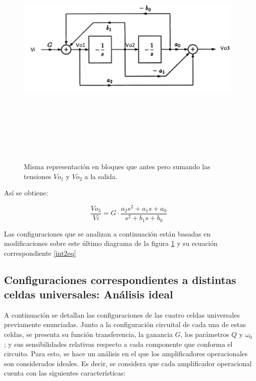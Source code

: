 \begin{figure}[H] %
	\centering
	\includegraphics[width=12cm,height=12cm,keepaspectratio]{../EJ4/imagenes/int2.png}
	\caption{Misma representaci\'on en bloques que antes pero sumando las tensiones $Vo_1$ y $Vo_2$ a la salida.}
	\label{int2}
\end{figure}

As\'i se obtiene:

\begin{equation}
	\frac{Vo_3}{Vi} = G \cdot \frac{a_2s^2+a_1s+a_0}{s^2+b_1s+b_0}
	\label{int2eq}
\end{equation}

Las configuraciones que se analizan a continuaci\'on est\'an basadas en modificaciones sobre este \'ultimo diagrama de la figura \ref{int2} y su ecuaci\'on correspondiente \ref{int2eq}

\subsection{Configuraciones correspondientes a distintas celdas universales: An\'alisis ideal}

A continuaci\'on se detallan las configuraciones de las cuatro celdas universales previamente enunciadas. Junto a la configuraci\'on circuital de cada una de estas celdas, se presenta su funci\'on transferencia, la ganancia $G$, los par\'ametros $Q$ y $\omega_0$; y sus sensibilidades relativas respecto a cada componente que conforma el circuito. Para esto, se hace un an\'alisis en el que los amplificadores operacionales son considerados ideales. Es decir, se considera que cada amplificador operacional cuenta con las siguientes caracter\'isticas:


